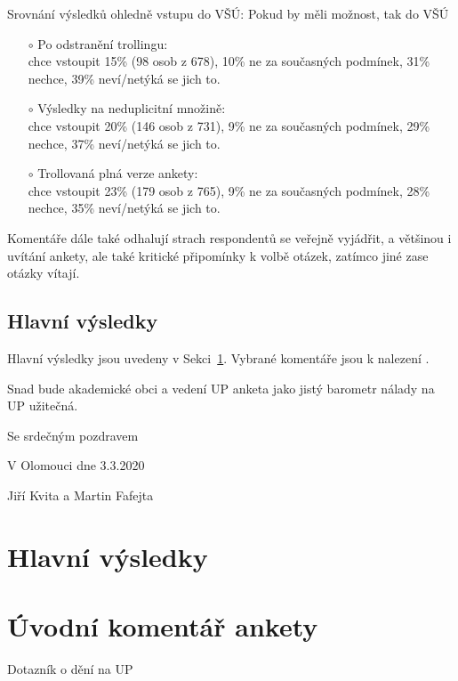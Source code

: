 \documentclass[a4paper,twoside]{article}
\begin{document}
\begin{itemize}
{\bf 
  \item Srovnání výsledků ohledně vstupu do VŠÚ: Pokud by měli možnost, tak do VŠÚ
    \begin{itemize}
       \item[$\circ$] Po odstranění trollingu:
       \\  chce vstoupit 15\% (98 osob z 678), 10\% ne za současných podmínek, 31\% nechce, 39\% neví/netýká se jich to.
       \item[$\circ$] Výsledky na neduplicitní množině:
       \\  chce vstoupit 20\% (146 osob z 731), 9\% ne za současných podmínek, 29\% nechce, 37\% neví/netýká se jich to.
       \item[$\circ$] Trollovaná plná verze ankety:
         \\ chce vstoupit 23\% (179 osob z 765), 9\% ne za současných podmínek, 28\% nechce, 35\% neví/netýká se jich to.
    \end{itemize}
}
  \item Komentáře dále také odhalují strach respondentů se veřejně vyjádřit, a většinou i uvítání ankety, ale také kritické připomínky k volbě otázek, zatímco jiné zase otázky vítají.
\end{itemize}

\subsection{Hlavní výsledky}
Hlavní výsledky jsou uvedeny v Sekci~\ref{sec:results}.
Vybrané komentáře jsou k nalezení .

\bigskip

\noindent Snad bude akademické obci a vedení UP anketa jako jistý barometr nálady na UP užitečná.

\bigskip

Se srdečným pozdravem

V Olomouci dne 3.3.2020

Jiří Kvita a Martin Fafejta


\newpage
\section{Hlavní výsledky}
\label{sec:results}



\appendix

\newpage
\section{Úvodní komentář ankety}
Dotazník o dění na UP
\end{document}
